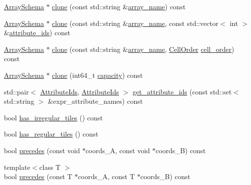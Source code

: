 \begin{DoxyCompactItemize}
\item 
\hyperlink{classArraySchema}{Array\+Schema} $\ast$ \hyperlink{classArraySchema_a682bd21c776abedf6546c1964d8386ed}{clone} (const std\+::string \&\hyperlink{classArraySchema_ae6df338bba60ba3eae504b4643607778}{array\+\_\+name}) const 
\item 
\hyperlink{classArraySchema}{Array\+Schema} $\ast$ \hyperlink{classArraySchema_aa84290128b575f5a91dcc91959774b10}{clone} (const std\+::string \&\hyperlink{classArraySchema_ae6df338bba60ba3eae504b4643607778}{array\+\_\+name}, const std\+::vector$<$ int $>$ \&\hyperlink{classArraySchema_a61357e5839af6acefcc7be9ef1a3b300}{attribute\+\_\+ids}) const 
\item 
\hyperlink{classArraySchema}{Array\+Schema} $\ast$ \hyperlink{classArraySchema_a0d85153c9e0d8b7848a39f766392cfc6}{clone} (const std\+::string \&\hyperlink{classArraySchema_ae6df338bba60ba3eae504b4643607778}{array\+\_\+name}, \hyperlink{classArraySchema_a847601130253f905337b5e284e1b78f2}{Cell\+Order} \hyperlink{classArraySchema_a15bc4e7fb776028c9705f38218eac785}{cell\+\_\+order}) const 
\item 
\hyperlink{classArraySchema}{Array\+Schema} $\ast$ \hyperlink{classArraySchema_a999d352b1e6ddfeb9892126c7c3a489f}{clone} (int64\+\_\+t \hyperlink{classArraySchema_ae438b6a084ea3b363fe51d555f5af746}{capacity}) const 
\item 
std\+::pair$<$ \hyperlink{classArraySchema_a55137cd3ae03a3978fd17f36025ca2a8}{Attribute\+Ids}, \hyperlink{classArraySchema_a55137cd3ae03a3978fd17f36025ca2a8}{Attribute\+Ids} $>$ \hyperlink{classArraySchema_aee4045b4eed3580643083cd475c96ae2}{get\+\_\+attribute\+\_\+ids} (const std\+::set$<$ std\+::string $>$ \&expr\+\_\+attribute\+\_\+names) const 
\item 
bool \hyperlink{classArraySchema_a118ad1f214246a449aa0a34007dfdabf}{has\+\_\+irregular\+\_\+tiles} () const 
\item 
bool \hyperlink{classArraySchema_a983eb95d8e7527cf4c40fb669b10cf10}{has\+\_\+regular\+\_\+tiles} () const 
\item 
bool \hyperlink{classArraySchema_af0f6a3d3067c5ac190c2c785ff9e2db6}{precedes} (const void $\ast$coords\+\_\+\+A, const void $\ast$coords\+\_\+\+B) const 
\item 
{\footnotesize template$<$class T $>$ }\\bool \hyperlink{classArraySchema_a6be4cb7763b18fbea8af1e2646bb6744}{precedes} (const T $\ast$coords\+\_\+\+A, const T $\ast$coords\+\_\+\+B) const 
\item 

\end{DoxyCompactItemize}
